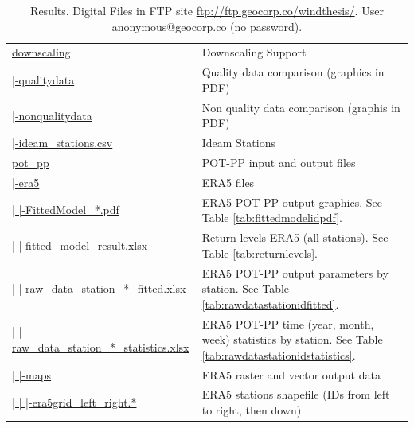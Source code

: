 \documentclass[12pt,oneside]{reedthesis}
\begin{document}
\begingroup\fontsize{8}{10}\selectfont
\begin{longtable}[t]{>{\raggedright\arraybackslash}p{2.2in}>{\raggedright\arraybackslash}p{4in}}
\caption[Results. Digital Files]{\label{tab:resultsstructure}Results. Digital Files in FTP site \href{ftp://ftp.geocorp.co/windthesis/}{ftp://ftp.geocorp.co/windthesis/}. User anonymous@geocorp.co (no password).}\\
\toprule
\multicolumn{1}{l}{Folder Tree - Ftp Links} & \multicolumn{1}{l}{Description}\\
\midrule
\href{ftp://ftp.geocorp.co/windthesis/downscaling/}{downscaling} & Downscaling Support\\
\href{ftp://ftp.geocorp.co/windthesis/downscaling/qualitydata/}{  |-qualitydata} & Quality data comparison (graphics in PDF)\\
\href{ftp://ftp.geocorp.co/windthesis/downscaling/nonqualitydata/}{  |-nonqualitydata} & Non quality data comparison (graphis in PDF)\\
\href{ftp://ftp.geocorp.co/windthesis/downscaling/ideam_stations.csv}{  |-ideam\_stations.csv} & Ideam Stations\\
\href{ftp://ftp.geocorp.co/windthesis/potpp/}{pot\_pp} & POT-PP input and output files\\
\href{ftp://ftp.geocorp.co/windthesis/potpp/era5/}{  |-era5} & ERA5 files\\
\href{ftp://ftp.geocorp.co/windthesis/potpp/era5/}{  |    |-FittedModel\_*.pdf} & ERA5 POT-PP output graphics. See Table \ref{tab:fittedmodelidpdf}.\\
\href{ftp://ftp.geocorp.co/windthesis/potpp/era5/fitted_model_result_PoissonProcessGumbelIntFunc.xlsx}{  |    |-fitted\_model\_result.xlsx} & Return levels ERA5 (all stations). See Table \ref{tab:returnlevels}.\\
\href{ftp://ftp.geocorp.co/windthesis/potpp/era5/}{  |    |-raw\_data\_station\_*\_fitted.xlsx} & ERA5 POT-PP output parameters by station. See Table \ref{tab:rawdatastationidfitted}.\\
\href{ftp://ftp.geocorp.co/windthesis/potpp/era5/}{  |    |-raw\_data\_station\_*\_statistics.xlsx} & ERA5 POT-PP time (year, month, week) statistics by station. See Table \ref{tab:rawdatastationidstatistics}.\\
\href{ftp://ftp.geocorp.co/windthesis/potpp/era5/maps/}{  |    |-maps} & ERA5 raster and vector output data\\
\href{ftp://ftp.geocorp.co/windthesis/potpp/era5/maps/}{  |    |    |-era5grid\_left\_right.*} & ERA5 stations shapefile (IDs from left to right, then down)\\

\end{longtable}
\end{document}
